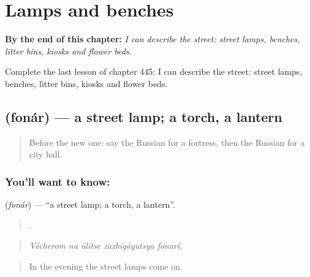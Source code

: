 
\chapter{Lamps and benches}
\label{ch:ru-lamps-and-benches}

\begin{chapteropening}
\textbf{By the end of this chapter:} \emph{I can describe the street: street lamps, benches, litter bins, kiosks and flower beds.}

Complete the last lesson of chapter 445: I can describe the street: street lamps, benches, litter bins, kiosks and flower beds.
\end{chapteropening}

\section[\texorpdfstring{\ru{фонарь} (fonár)}{фонарь (fonár)}]{ (fonár) — a street lamp; a torch, a lantern}

\label{lesson:RU-C445-fonar}



\begin{quote}
Before the new one: say the Russian for a fortress, then the Russian for a city hall.
\end{quote}

\subsection*{You'll want to know: }
\textbf{} (\emph{fonár}) — \textquotedblleft{}a street lamp; a torch, a lantern\textquotedblright{}.

\begin{quote}
    .
\end{quote}

\begin{quote}
\emph{Vécherom na úlitse zazhigáyutsya fonarí.}
\end{quote}

\begin{quote}
In the evening the street lamps come on.
\end{quote}

